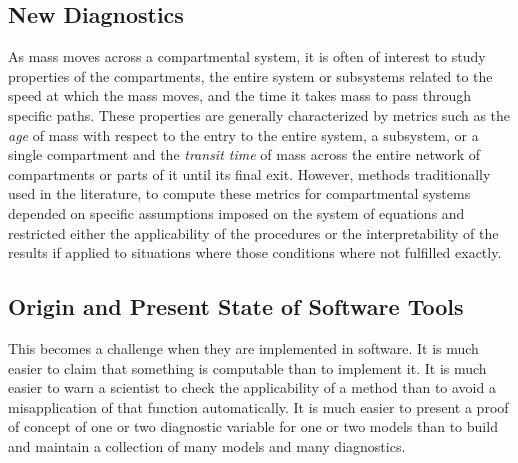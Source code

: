 \subsection{New Diagnostics} 
As mass moves across a compartmental system, it is often of interest to study
properties of the compartments, the entire system or subsystems related to the speed at
which the mass moves, and the time it takes mass to pass through specific
paths. These properties are generally characterized
by metrics such as the \emph{age} of mass with respect to the entry to the entire
system, a subsystem, or a single compartment and the \emph{transit time} of mass 
across the entire network of compartments or parts of it until its
final exit. 
However, methods traditionally used in the literature, to compute these metrics for
compartmental systems depended on specific assumptions imposed on the system
of equations \citep{Sierra2017GCB} and restricted either the applicability 
of the procedures or the interpretability of the results if applied to situations 
where those conditions where not fulfilled exactly. 

\subsection{Origin and Present State of Software Tools}
This becomes a challenge when they are implemented in software.
It is much easier to claim that something is computable than to implement it.
It is much easier to warn a scientist to check the applicability of a method than to avoid
a misapplication of that function automatically.
It is much easier to present a proof of concept of one or two diagnostic variable for one or two models than to build and maintain a collection of many models and many diagnostics.

